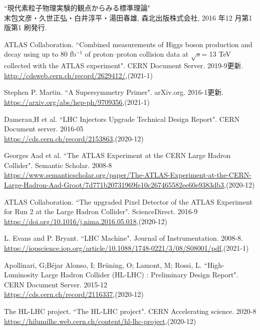 \begin{thebibliography}{9}

``現代素粒子物理実験的観点からみる標準理論" \\
末包文彦・久世正弘・白井淳平・湯田春雄, 森北出版株式会社, 2016 年12 月第1 版第1 刷発行.

ATLAS Collaboration. ``Combined measurements of Higgs boson production and decay using up to 80 fb${}^{−1}$ of proton--proton collision data at $\sqrt{s}$= 13 TeV collected with the ATLAS experiment". CERN Document Server. 2019-9更新.\\
\url{http://cdsweb.cern.ch/record/2629412/},(2021-1)

Stephen P. Martin. ``A Supersymmetry Primer". arXiv.org. 2016-1更新.\\
\url{https://arxiv.org/abs/hep-ph/9709356},(2021-1)

Damerau,H et al. ``LHC Injectors Upgrade Technical Design Report". CERN Document server. 2016-05\\
\url{https://cds.cern.ch/record/2153863},(2020-12)

Georges Aad et al. ``The ATLAS Experiment at the CERN Large Hadron Collider". Semantic Scholar. 2008-8\\
\url{https://www.semanticscholar.org/paper/The-ATLAS-Experiment-at-the-CERN-Large-Hadron-Aad-Groot/7d771b20731969fe10c267465582ee60e9383db3},(2020-12)

ATLAS Collaboration. ``The upgraded Pixel Detector of the ATLAS Experiment for Run 2 at the Large Hadron Collider". ScienceDirect. 2016-9\\
\url{https://doi.org/10.1016/j.nima.2016.05.018},(2020-12)

L. Evans and P. Bryant. ``LHC Machine". Journal of Instrumentation. 2008-8.\\
\url{https://iopscience.iop.org/article/10.1088/1748-0221/3/08/S08001/pdf},(2021-1)

Apollinari, G;Béjar Alonso, I; Brüning, O; Lamont, M; Rossi, L. ``High-Luminosity Large Hadron Collider (HL-LHC) : Preliminary Design Report". CERN Document Server. 2015-12\\
\url{https://cds.cern.ch/record/2116337},(2020-12)

The HL-LHC project. ``The HL-LHC project". CERN Accelerating science. 2020-8\\
\url{https://hilumilhc.web.cern.ch/content/hl-lhc-project},(2020-12)


\end{thebibliography}
